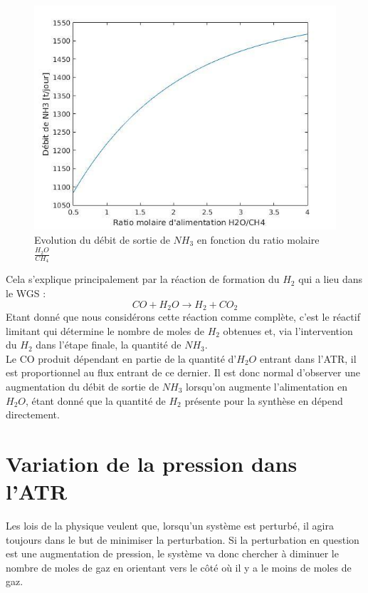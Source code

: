 \documentclass[12pt]{report}
\begin{document}
\begin{figure}[H]
\begin{center}
\includegraphics[scale=0.6]{debit_NH3_ratio_H2O}
\caption{Evolution du débit de sortie de $NH_3$ en fonction du ratio molaire $\frac{H_2O}{CH_4}$}
\end{center}
\end{figure}

Cela s'explique principalement par la réaction de formation du $H_2$ qui a lieu dans le WGS : 
\begin{equation}
CO + H_2O \rightarrow H_2 + CO_2
\end{equation}
Etant donné que nous considérons cette réaction comme complète,  c'est le réactif limitant qui détermine le nombre de moles de $H_2$ obtenues et, via l'intervention du $H_2$ dans l'étape finale, la quantité de $NH_3$.\\

Le CO produit dépendant en partie de la quantité d'$H_2O$ entrant dans l'ATR, il est proportionnel au flux entrant de ce dernier. Il est donc normal d'observer une augmentation du débit de sortie de $NH_3$ lorsqu'on augmente l'alimentation en $H_2O$, étant donné que la quantité de $H_2$ présente pour la synthèse en dépend directement.\\

\section{Variation de la pression dans l'ATR}

Les lois de la physique veulent que, lorsqu'un système est perturbé, il agira toujours dans le but de minimiser la perturbation. Si la perturbation en question est une augmentation de pression, le système va donc chercher à diminuer le nombre de moles de gaz en orientant vers le côté où il y a  le moins de moles de gaz.\\
\end{document}
